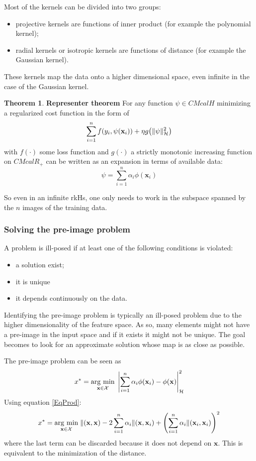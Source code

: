 \documentclass[12pt, letterpaper]{article}
\theoremstyle{definition}
\newcommand{\x}{\mathbf{x}}
\DeclarePairedDelimiter\autobracket{(}{)}
\newcommand{\br}[1]{\autobracket*{#1}}
\newtheorem{theorem}{Theorem}
\newcommand{\argmin}[1]{\underset{#1}{\operatorname{arg}\,\operatorname{min}}\;}
\let\tb\textbf
\begin{document}
Most of the kernels can be divided into two groups:
\begin{itemize}
\item projective kernels are functions of inner product (for example the polynomial kernel);
\item radial kernels or isotropic kernels are functions of distance (for example the Gaussian kernel).
\end{itemize}
These kernels map the data onto a higher dimensional space, even infinite in the case of the Gaussian kernel.
\begin{theorem}{\tb{Representer theorem}}
For any function $\psi \in CMcal{H}$ minimizing a regularized cost function in the form of
\begin{equation}
\sum_{i=1}^n f\br{y_i, \psi(\x_i)} + \eta g\br{\|\psi\|^2_\CMcal{H}}
\end{equation}
with $f(\cdot)$ some loss function and $g(\cdot)$ a strictly monotonic increasing function on $CMcal{R}_{+}$ can be written as an expansion in terms of available data:
\begin{equation}
\psi = \sum_{i=1}^n \alpha_i \phi(\x_i)
\end{equation} 
\end{theorem}
So even in an infinite rkHs, one only needs to work in the subspace spanned by the $n$ images of the training data.

\subsubsection{Solving the pre-image problem}
A problem is ill-posed if at least one of the following conditions is violated:
\begin{itemize}
\item a solution exist;
\item it is unique 
\item it depends continuously on the data.
\end{itemize}
Identifying the pre-image problem is typically an ill-posed problem due to the higher dimensionality of the feature space. As so, many elements might not have a pre-image in the input space and if it exists it might not be unique. The goal becomes to look for an approximate solution whose map is as close as possible.

The pre-image problem can be seen as 
\begin{equation}
x^* = \argmin{\x \in \CMcal{X}} \left| \sum_{i=1}^n \alpha_i \phi(\x_i) - \phi(\x)\right|^2_{\CMcal{H}}
\end{equation}
Using equation \ref{EqProd}:
\begin{equation}
\label{MinFunct}
x^* = \argmin{\x \in \CMcal{X}} \CMcal{k}(\x,\x) -2 \sum_{i=1}^n \alpha_i \CMcal{k}(\x,\x_i) + \br{\sum_{i=1}^n \alpha_i \CMcal{k}(\x_i,\x_i)}^2
\end{equation}
where the last term can be discarded because it does not depend on $\x$. This is equivalent to the minimization of the distance.
\end{document}
